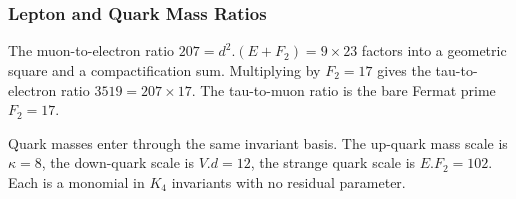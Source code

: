 \documentclass[11pt,a4paper]{book}
\def\cdot{.}%
\begin{document}
\begin{code}
\AgdaSpace{}%
\AgdaSpace{}%
\AgdaOperator{\AgdaPrimitive{*}}\AgdaSpace{}%
\<%
\\
%
\\[\AgdaEmptyExtraSkip]%
\>[0]\AgdaSpace{}%
\AgdaSymbol{:}\AgdaSpace{}%
\<%
\\
\>[0]\AgdaSpace{}%
\AgdaSymbol{=}\AgdaSpace{}%
\<%
\\
\>[0][@{}l@{\AgdaIndent{0}}]%
\>[2]\AgdaSymbol{\{}\AgdaSpace{}%
\AgdaSpace{}%
\AgdaSymbol{=}\AgdaSpace{}%
\<%
\\
%
\>[2]\AgdaSymbol{;}\AgdaSpace{}%
\AgdaSpace{}%
\AgdaSymbol{=}\AgdaSpace{}%
\<%
\\
%
\>[2]\AgdaSymbol{;}\AgdaSpace{}%
\AgdaSpace{}%
\AgdaSymbol{=}\AgdaSpace{}%
\<%
\\
%
\>[2]\AgdaSymbol{;}\AgdaSpace{}%
\AgdaSpace{}%
\AgdaSymbol{=}\AgdaSpace{}%
\AgdaSpace{}%
\AgdaSymbol{\}}\<%
\end{code}

\subsubsection*{Lepton and Quark Mass Ratios}

The muon-to-electron ratio $207 = d^2 \cdot (E + F_2) = 9 \times 23$
factors into a geometric square and a compactification sum.  Multiplying
by $F_2 = 17$ gives the tau-to-electron ratio $3519 = 207 \times 17$.
The tau-to-muon ratio is the bare Fermat prime $F_2 = 17$.

Quark masses enter through the same invariant basis.  The up-quark mass
scale is $\kappa = 8$, the down-quark scale is $V \cdot d = 12$, the
strange quark scale is $E \cdot F_2 = 102$.  Each is a monomial in
$K_4$ invariants with no residual parameter.
\end{document}
